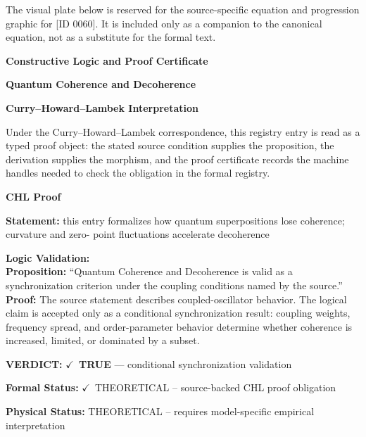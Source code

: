 \begingroup\footnotesize\sloppy
The visual plate below is reserved for the source-specific equation and progression graphic for [ID 0060]. It is included only as a companion to the canonical equation, not as a substitute for the formal text.
\par\endgroup
\ifTZPDarkEdition
{}
\fi

\clearpage
\begingroup\tzpsupportsetup
\noindent\textbf{\fontsize{10.8pt}{12.8pt}\selectfont [ID 0060] Constructive Logic and Proof Certificate}\par
\noindent\textbf{\fontsize{10pt}{12pt}\selectfont Quantum Coherence and Decoherence}\par
\vspace{0.45em}
\begingroup
\footnotesize
\setlength{\parskip}{0.22em}
\setlength{\parindent}{0pt}
\noindent\textbf{Curry--Howard--Lambek Interpretation}\par
Under the Curry--Howard--Lambek correspondence, this registry entry is read as a typed proof
object: the stated source condition supplies the proposition, the derivation supplies the
morphism, and the proof certificate records the machine handles needed to check the obligation
in the formal registry.

\vspace{0.45em}
\noindent\textbf{CHL Proof}\par
\textbf{Statement:} this entry formalizes how quantum superpositions lose coherence; curvature and zero-
point fluctuations accelerate decoherence

\textbf{Logic Validation:}\\
\textbf{Proposition:} ``Quantum Coherence and Decoherence is valid as a synchronization criterion under the
coupling conditions named by the source.''\\
\textbf{Proof:} The source statement describes coupled-oscillator behavior. The logical claim is
accepted only as a conditional synchronization result: coupling weights, frequency
spread, and order-parameter behavior determine whether coherence is increased, limited,
or dominated by a subset.

\textbf{VERDICT:} \ensuremath{\checkmark}\ \textbf{TRUE} --- conditional synchronization validation

\textbf{Formal Status:} \ensuremath{\checkmark}\ THEORETICAL -- source-backed CHL proof obligation

\textbf{Physical Status:} THEORETICAL -- requires model-specific empirical interpretation
\par\vspace{0.45em}
\par
\ifTZPDarkEdition
{}
\fi
\endgroup
\endgroup

